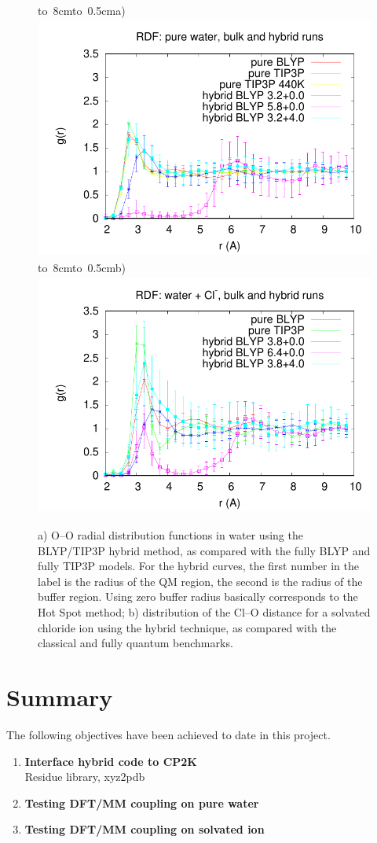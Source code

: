 \documentclass[11pt]{revtex4}
\begin{document}
\begin{figure}
\hbox{\vbox to 8cm{\hbox to 0.5cm{a)}\vfil}\includegraphics[height=8cm]{summary_pure_water_rdfs_G}}
\hbox{\vbox to 8cm{\hbox to 0.5cm{b)}\vfil}\includegraphics[height=8cm]{summary_water_Cl_rdfs_G}}
\caption{a) O--O radial distribution functions in water using the BLYP/TIP3P hybrid method, as compared with the fully BLYP and fully TIP3P models. For the hybrid curves, the first number in the label is the radius of the QM region, the second is the radius of the buffer region. Using zero buffer radius basically corresponds to the Hot Spot method; b) distribution of the Cl--O distance for a solvated chloride ion using the hybrid technique, as compared with the classical and fully quantum benchmarks. }
\label{water_blyp_rdf}
\end{figure}
\section{Summary}

The following objectives have been achieved to date in this project.
\begin{enumerate}
\item {\bf Interface hybrid code to CP2K}\\Residue library, xyz2pdb
\item {\bf Testing DFT/MM coupling on pure water}
\item {\bf Testing DFT/MM coupling on solvated ion}
\end{enumerate}
\end{document}
